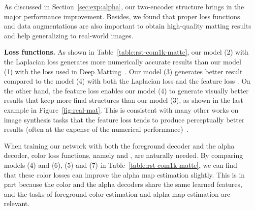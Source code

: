 \documentclass[10pt,twocolumn,letterpaper]{article}
\begin{document}
As discussed in Section~\ref{sec:exp:alpha}, our two-encoder structure brings in the major performance improvement. Besides, we found that proper loss functions and data augmentations are also important to obtain high-quality matting results and help generalizing to real-world images.


\noindent\textbf{Loss functions.} As shown in Table~\ref{table:rst-com1k-matte}, our model (2) with the Laplacian loss  generates more numerically accurate results than our model (1) with the loss used in Deep Matting~\cite{xu2017deep}. Our model (3) generates better result compared to the model (4) with both the Laplacian loss and the feature loss . On the other hand, the feature loss enables our model (4) to generate visually better results that keep more final structures than our model (3), as shown in the last example in Figure~\ref{fig:real-mat}. This is consistent with many other works on image synthesis tasks that the feature loss tends to produce perceptually better results (often at the expense of the numerical performance)~\cite{blau2018perception, dosovitskiy2016generating, ledig2017photo, niklaus2018context,  sajjadi2017enhancenet,zhang2018unreasonable, zhu2016generative}.

When training our network with both the foreground decoder and the alpha decoder, color loss functions, namely  and , are naturally needed. By comparing models (4) and (6), (5) and (7) in Table~\ref{table:rst-com1k-matte}, we can find that these color losses can improve the alpha map estimation slightly. This is in part because the color and the alpha decoders share the same learned features, and the tasks of foreground color estimation and alpha map estimation are relevant.
\end{document}
